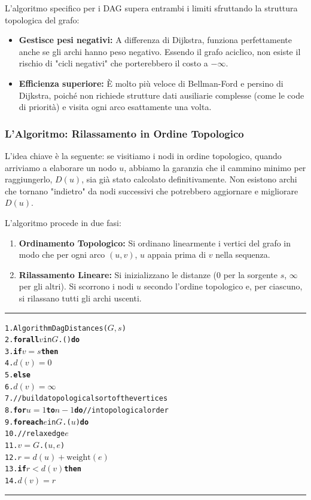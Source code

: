 L'algoritmo specifico per i DAG supera entrambi i limiti sfruttando la struttura topologica del grafo:
\begin{itemize}
    \item \textbf{Gestisce pesi negativi:} A differenza di Dijkstra, funziona perfettamente anche se gli archi hanno peso negativo. Essendo il grafo aciclico, non esiste il rischio di "cicli negativi" che porterebbero il costo a $-\infty$.
    \item \textbf{Efficienza superiore:} È molto più veloce di Bellman-Ford e persino di Dijkstra, poiché non richiede strutture dati ausiliarie complesse (come le code di priorità) e visita ogni arco esattamente una volta.
\end{itemize}

\clearpage
\subsubsection{L'Algoritmo: Rilassamento in Ordine Topologico}
L'idea chiave è la seguente: se visitiamo i nodi in ordine topologico, quando arriviamo a elaborare un nodo $u$, abbiamo la garanzia che il cammino minimo per raggiungerlo, $D(u)$, sia già stato calcolato definitivamente. Non esistono archi che tornano "indietro" da nodi successivi che potrebbero aggiornare e migliorare $D(u)$.

L'algoritmo procede in due fasi:
\begin{enumerate}
    \item \textbf{Ordinamento Topologico:} Si ordinano linearmente i vertici del grafo in modo che per ogni arco $(u, v)$, $u$ appaia prima di $v$ nella sequenza.
    \item \textbf{Rilassamento Lineare:} Si inizializzano le distanze (0 per la sorgente $s$, $\infty$ per gli altri). Si scorrono i nodi $u$ secondo l'ordine topologico e, per ciascuno, si rilassano tutti gli archi uscenti.
\end{enumerate}

\vspace{1\baselineskip}
\hrule
\begin{alltt}
1.  Algorithm DagDistances(\(G, s\))
2.      \textbf{for all} \(v\) in \(G\).() \textbf{do}
3.          \textbf{if} \(v = s\) \textbf{then}
4.              \(d(v) = 0\)
5.          \textbf{else}
6.              \(d(v) = \infty\)
7.      // build a topological sort of the vertices
8.      \textbf{for} \(u = 1\) \textbf{to} \(n - 1\) \textbf{do} // in topological order
9.          \textbf{for each} \(e\) in \(G\).(\(u\)) \textbf{do}
10.             // relax edge \(e\)
11.             \(v = G\).(\(u, e\))
12.             \(r = d(u) + \text{weight}(e)\)
13.             \textbf{if} \(r < d(v)\) \textbf{then}
14.                 \(d(v) = r\)            
\end{alltt}
\hrule 
\vspace{1\baselineskip}


